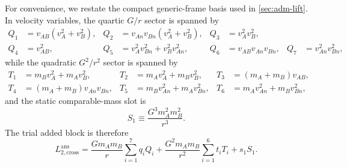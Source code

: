 \documentclass[11pt]{article}
\begin{document}
For convenience, we restate the compact generic-frame basis used in
\cref{sec:adm-lift}.  In velocity variables, the quartic \(G/r\) sector is spanned by
\begin{align}
Q_1&=v_{AB}(v_A^2+v_B^2),
&
Q_2&=v_{An}v_{Bn}(v_A^2+v_B^2),
&
Q_3&=v_A^2v_B^2,
\nonumber\\
Q_4&=v_{AB}^2,
&
Q_5&=v_A^2v_{Bn}^2+v_B^2v_{An}^2,
&
Q_6&=v_{AB}v_{An}v_{Bn},
&
Q_7&=v_{An}^2v_{Bn}^2,
\label{eq:app-adm-Q-basis}
\end{align}
while the quadratic \(G^2/r^2\) sector is spanned by
\begin{align}
T_1&=m_B v_A^2+m_A v_B^2,
&
T_2&=m_A v_A^2+m_B v_B^2,
&
T_3&=(m_A+m_B)v_{AB},
\nonumber\\
T_4&=(m_A+m_B)v_{An}v_{Bn},
&
T_5&=m_B v_{An}^2+m_A v_{Bn}^2,
&
T_6&=m_A v_{An}^2+m_B v_{Bn}^2,
\label{eq:app-adm-T-basis}
\end{align}
and the static comparable-mass slot is
\begin{equation}
S_1\equiv \frac{G^3m_A^2m_B^2}{r^3}.
\label{eq:app-adm-S-basis}
\end{equation}
The trial added block is therefore
\begin{equation}
L_{2,\mathrm{cross}}^{\mathrm{ans}}
=\frac{Gm_A m_B}{r}\sum_{i=1}^{7}q_iQ_i
+\frac{G^2m_A m_B}{r^2}\sum_{i=1}^{6}t_iT_i
+s_1S_1.
\label{eq:app-adm-cross-ansatz}
\end{equation}
\end{document}
